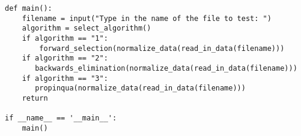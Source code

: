 \documentclass{article}
\begin{document}
\begin{lstlisting}[captionpos=b, caption=Impementation, label=listing:sparql_getallindividuals,
   basicstyle=\ttfamily]
def main():
    filename = input("Type in the name of the file to test: ")
    algorithm = select_algorithm()
    if algorithm == "1":
        forward_selection(normalize_data(read_in_data(filename)))
    if algorithm == "2":
       backwards_elimination(normalize_data(read_in_data(filename)))
    if algorithm == "3":
       propinqua(normalize_data(read_in_data(filename)))
    return

if __name__ == '__main__':
    main()


\end{lstlisting}
\end{document}
